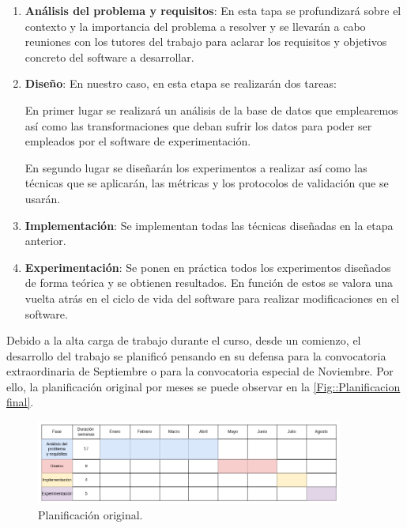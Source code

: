     \begin{enumerate}
        \item \textbf{Análisis del problema y requisitos}: En esta tapa se profundizará sobre el contexto y la importancia del problema a resolver y se llevarán a cabo reuniones con los tutores del trabajo para aclarar los requisitos y objetivos concreto del software a desarrollar. 
        \item \textbf{Diseño}: En nuestro caso, en esta etapa se realizarán dos tareas: 
        
        En primer lugar se realizará un análisis de la base de datos que emplearemos así como las transformaciones que deban sufrir los datos para poder ser empleados por el software de experimentación. 

        En segundo lugar se diseñarán los experimentos a realizar así como las técnicas que se aplicarán, las métricas y los protocolos de validación que se usarán.

        \item \textbf{Implementación}: Se implementan todas las técnicas diseñadas en la etapa anterior.
        \item \textbf{Experimentación}: Se ponen en práctica todos los experimentos diseñados de forma teórica y se obtienen resultados. En función de estos se valora una vuelta atrás en el ciclo de vida del software para realizar modificaciones en el software.
    \end{enumerate}
    
    \medskip

    \noindent Debido a la alta carga de trabajo durante el curso, desde un comienzo, el desarrollo del trabajo se planificó pensando en su defensa para la convocatoria extraordinaria de Septiembre o para la convocatoria especial de Noviembre. Por ello, la planificación original por meses se puede observar en la \autoref{Fig::Planificacion final}.


    \begin{figure}[!h]
        \centering
        \includegraphics[width=0.9\textwidth]{img/plan_provisional.png}
        \caption{Planificación original.}
        \label{Fig::Planificacion original}
    \end{figure}

